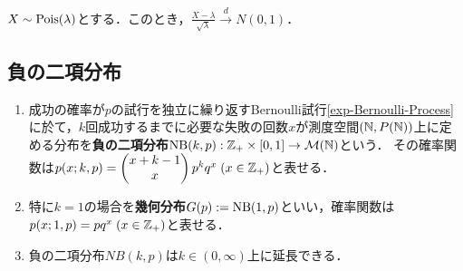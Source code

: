 \documentclass[uplatex,dvipdfmx]{jsreport}
\begin{document}
\begin{theorem}
    $X\sim\mathrm{Pois}(\lambda)$とする．このとき，$\frac{X-\lambda}{\sqrt{\lambda}}\xrightarrow{d}N(0,1)$．
\end{theorem}

\subsection{負の二項分布}

\begin{tcolorbox}[colframe=ForestGreen, colback=ForestGreen!10!white,breakable,colbacktitle=ForestGreen!40!white,coltitle=black,fonttitle=\bfseries\sffamily,
title=]
    
\end{tcolorbox}

\begin{definition}\mbox{}
    \begin{enumerate}
        \item 成功の確率が$p$の試行を独立に繰り返すBernoulli試行\ref{exp-Bernoulli-Process}に於て，$k$回成功するまでに必要な失敗の回数$x$が測度空間$(\mathbb{N},P(\mathbb{N}))$上に定める分布を\textbf{負の二項分布}$\mathrm{NB}(k,p):\mathbb{Z}_+\times[0,1]\to\mathcal{M}(\mathbb{N})$という．
        その確率関数は$p(x;k,p)=\begin{pmatrix}x+k-1\\x\end{pmatrix}p^kq^x\;(x\in\mathbb{Z}_+)$と表せる．
        \item 特に$k=1$の場合を\textbf{幾何分布}$G(p):=\mathrm{NB}(1,p)$といい，確率関数は$p(x;1,p)=pq^x\;(x\in\mathbb{Z}_+)$と表せる．
        \item 負の二項分布$NB(k,p)$は$k\in(0,\infty)$上に延長できる．
    \end{enumerate}
\end{definition}
\end{document}
